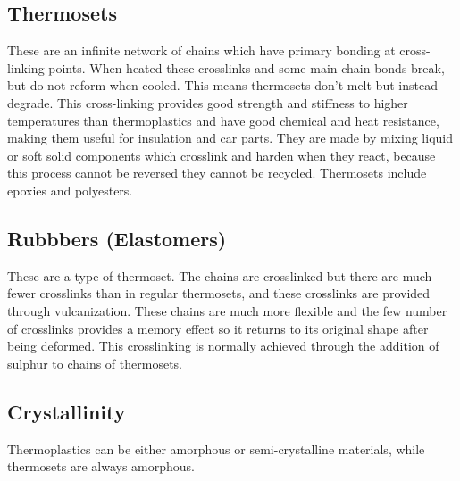 \documentclass[a4paper, 12pt]{article}
\begin{document}
	\subsection{Thermosets}
		These are an infinite network of chains which have primary bonding at cross-linking points. When heated these crosslinks and some main chain bonds break, but do not reform when cooled. This means thermosets don't melt but instead degrade. This cross-linking provides good strength and stiffness to higher temperatures than thermoplastics and have good chemical and heat resistance, making them useful for insulation and car parts. They are made by mixing liquid or soft solid components which crosslink and harden when they react, because this process cannot be reversed they cannot be recycled. Thermosets include epoxies and polyesters. 
		
	\subsection{Rubbbers (Elastomers)}
	These are a type of thermoset. The chains are crosslinked but there are much fewer crosslinks than in regular thermosets, and these crosslinks are provided through vulcanization. These chains are much more flexible and the few number of crosslinks provides a memory effect so it returns to its original shape after being deformed. This crosslinking is normally achieved through the addition of sulphur to chains of thermosets. 
	
	\subsection{Crystallinity}
		Thermoplastics can be either amorphous or semi-crystalline materials, while thermosets are always amorphous.
\end{document}
